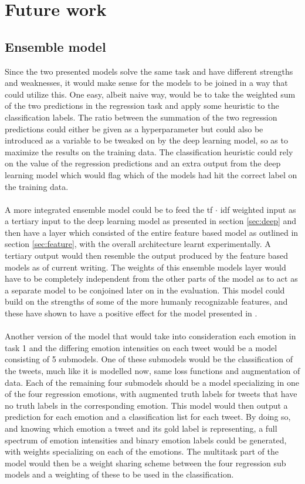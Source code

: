 
\section{Future work}

\subsection{Ensemble model}
Since the two presented models solve the same task and have different strengths and weaknesses, it would make sense for the models to be joined in a way that could utilize this. One easy, albeit naive way, would be to take the weighted sum of the two predictions in the regression task and apply some heuristic to the classification labels. The ratio between the summation of the two regression predictions could either be given as a hyperparameter but could also be introduced as a variable to be tweaked on by the deep learning model, so as to maximize the results on the training data. The classification heuristic could rely on the value of the regression predictions and an extra output from the deep learning model which would flag which of the models had hit the correct label on the training data.\\
\\
A more integrated ensemble model could be to feed the tf $\cdot$ idf weighted input as a tertiary input to the deep learning model as presented in section \ref{sec:deep} and then have a layer which consisted of the entire feature based model as outlined in section \ref{sec:feature}, with the overall architecture learnt experimentally. A tertiary output would then resemble the output produced by the feature based models as of current writing. The weights of this ensemble models layer would have to be completely independent from the other parts of the model as to act as a separate model to be conjoined later on in the evaluation. This model could build on the strengths of some of the more humanly recognizable features, and these have shown to have a positive effect for the model presented in \cite{ims}.\\
\\
Another version of the model that would take into consideration each emotion in task 1 and the differing emotion intensities on each tweet would be a model consisting of 5 submodels. One of these submodels would be the classification of the tweets, much like it is modelled now, same loss functions and augmentation of data. Each of the remaining four submodels should be a model specializing in one of the four regression emotions, with augmented truth labels for tweets that have no truth labels in the corresponding emotion. This model would then output a prediction for each emotion and a classification list for each tweet. By doing so, and knowing which emotion a tweet and its gold label is representing, a full spectrum of emotion intensities and binary emotion labels could be generated, with weights specializing on each of the emotions. The multitask part of the model would then be a weight sharing scheme between the four regression sub models and a weighting of these to be used in the classification.

